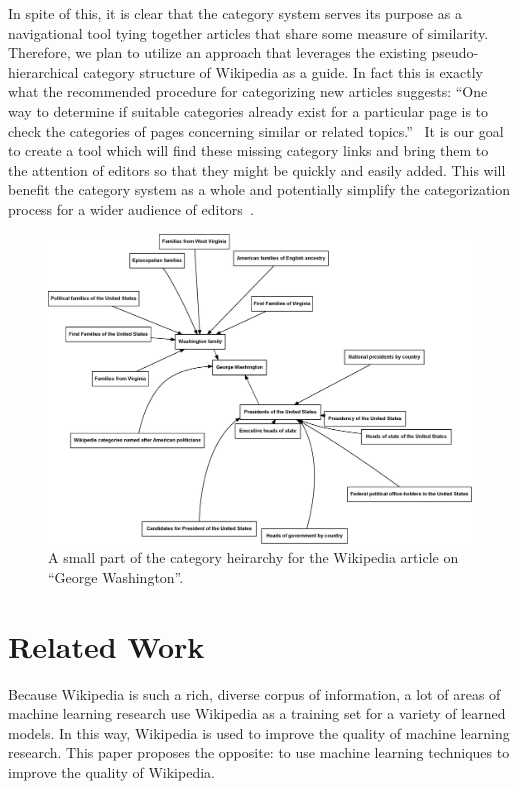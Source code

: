 \documentclass{sig-alternate}
\begin{document}
In spite of this, it is clear that the category system serves its purpose as a navigational tool tying together articles that share some measure of similarity. Therefore, we plan to utilize an approach that leverages the existing pseudo-hierarchical category structure of Wikipedia as a guide. In fact this is exactly what the recommended procedure for categorizing new articles suggests: ``One way to determine if suitable categories already exist for a particular page is to check the categories of pages concerning similar or related topics.''~\cite{cattalk} It is our goal to create a tool which will find these missing category links and bring them to the attention of editors so that they might be quickly and easily added. This will benefit the category system as a whole and potentially simplify the categorization process for a wider audience of editors~\cite{Fu}.
\begin{figure}[htb!]
	\begin{center}
		\includegraphics[width=1.0\linewidth]{washington-graph}
	\end{center}
	\vspace{-12pt}
	\caption{A small part of the category heirarchy for the Wikipedia article on ``George Washington''.}
	\label{fig:washington-graph}
\end{figure}


\section{Related Work}
\label{sec:related_work}
Because Wikipedia is such a rich, diverse corpus of information, a lot of areas of machine learning research use Wikipedia as a training set for a variety of learned models. In this way, Wikipedia is used to improve the quality of machine learning research. This paper proposes the opposite: to use machine learning techniques to improve the quality of Wikipedia.
\end{document}
